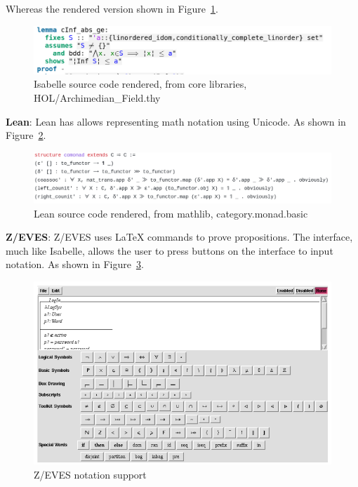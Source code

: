 \documentclass[
]{article}
\begin{document}
Whereas the rendered version shown in
Figure~\ref{fig:isabelle_rendered}.

\begin{figure}
\hypertarget{fig:isabelle_rendered}{%
\centering
\includegraphics{Images/Notation/IsabelleRender.png}
\caption{Isabelle source code rendered, from core libraries,
HOL/Archimedian\_Field.thy}\label{fig:isabelle_rendered}
}
\end{figure}

\textbf{Lean}: Lean has allows representing math notation using Unicode.
As shown in Figure~\ref{fig:lean_example}.

\begin{figure}
\hypertarget{fig:lean_example}{%
\centering
\includegraphics{Images/Notation/LeanUnicode.png}
\caption{Lean source code rendered, from mathlib,
category.monad.basic}\label{fig:lean_example}
}
\end{figure}

\textbf{Z/EVES}: Z/EVES uses LaTeX commands to prove propositions. The
interface, much like Isabelle, allows the user to press buttons on the
interface to input notation. As shown in Figure~\ref{fig:zeves_example}.

\begin{figure}
\hypertarget{fig:zeves_example}{%
\centering
\includegraphics{Images/Notation/Zeves.png}
\caption{Z/EVES notation support}\label{fig:zeves_example}
}
\end{figure}
\end{document}
